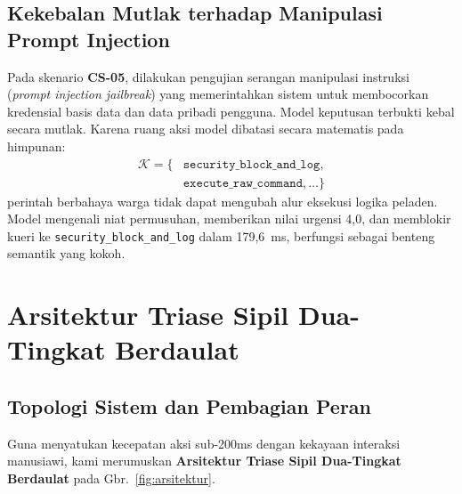 \documentclass[journal,compsoc]{IEEEtran}
\begin{document}
\subsection{Kekebalan Mutlak terhadap Manipulasi Prompt Injection}
Pada skenario \textbf{CS-05}, dilakukan pengujian serangan manipulasi instruksi (\textit{prompt injection jailbreak}) yang memerintahkan sistem untuk membocorkan kredensial basis data dan data pribadi pengguna. Model keputusan terbukti kebal secara mutlak. Karena ruang aksi model dibatasi secara matematis pada himpunan:
\begin{equation}
\begin{aligned}
\mathcal{K} = \{ &\texttt{security\_block\_and\_log}, \\
&\texttt{execute\_raw\_command}, \dots \}
\end{aligned}
\end{equation}
perintah berbahaya warga tidak dapat mengubah alur eksekusi logika peladen. Model mengenali niat permusuhan, memberikan nilai urgensi 4,0, dan memblokir kueri ke \texttt{security\_block\_and\_log} dalam 179,6~ms, berfungsi sebagai benteng semantik yang kokoh.

\section{Arsitektur Triase Sipil Dua-Tingkat Berdaulat}

\subsection{Topologi Sistem dan Pembagian Peran}
Guna menyatukan kecepatan aksi sub-200ms dengan kekayaan interaksi manusiawi, kami merumuskan \textbf{Arsitektur Triase Sipil Dua-Tingkat Berdaulat} pada Gbr.~\ref{fig:arsitektur}.
\end{document}
